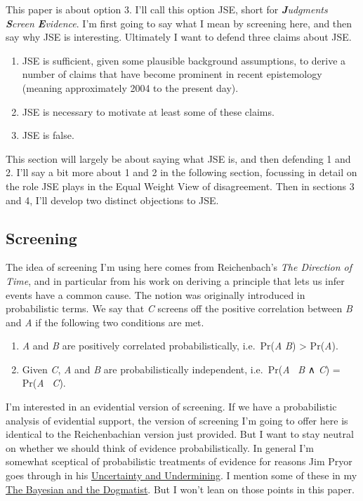 \documentclass[
  11pt,
  letterpaper,
  DIV=11,
  numbers=noendperiod,
  twoside]{scrartcl}
\providecommand{\tightlist}{%
  \setlength{\itemsep}{0pt}\setlength{\parskip}{0pt}}
\begin{document}
This paper is about option 3. I'll call this option JSE, short for
\emph{\textbf{J}udgments \textbf{S}creen \textbf{E}vidence}. I'm first
going to say what I mean by screening here, and then say why JSE is
interesting. Ultimately I want to defend three claims about JSE.

\begin{enumerate}
\def\labelenumi{\arabic{enumi}.}
\tightlist
\item
  JSE is sufficient, given some plausible background assumptions, to
  derive a number of claims that have become prominent in recent
  epistemology (meaning approximately 2004 to the present day).
\item
  JSE is necessary to motivate at least some of these claims.
\item
  JSE is false.
\end{enumerate}

This section will largely be about saying what JSE is, and then
defending 1 and 2. I'll say a bit more about 1 and 2 in the following
section, focussing in detail on the role JSE plays in the Equal Weight
View of disagreement. Then in sections 3 and 4, I'll develop two
distinct objections to JSE.

\subsection{Screening}\label{screening-1}

The idea of screening I'm using here comes from Reichenbach's \emph{The
Direction of Time}, and in particular from his work on deriving a
principle that lets us infer events have a common cause. The notion was
originally introduced in probabilistic terms. We say that \emph{C}
screens off the positive correlation between \emph{B} and \emph{A} if
the following two conditions are met.

\begin{enumerate}
\def\labelenumi{\arabic{enumi}.}
\tightlist
\item
  \emph{A} and \emph{B} are positively correlated probabilistically,
  i.e.~Pr(\emph{A} \textbar{} \emph{B}) \textgreater{} Pr(\emph{A}).
\item
  Given \emph{C}, \emph{A} and \emph{B} are probabilistically
  independent, i.e.~Pr(\emph{A}~\textbar{} \emph{B} ∧ \emph{C}) =
  Pr(\emph{A}~\textbar{} \emph{C}).
\end{enumerate}

I'm interested in an evidential version of screening. If we have a
probabilistic analysis of evidential support, the version of screening
I'm going to offer here is identical to the Reichenbachian version just
provided. But I want to stay neutral on whether we should think of
evidence probabilistically. In general I'm somewhat sceptical of
probabilistic treatments of evidence for reasons Jim Pryor goes through
in his
\href{http://www.jimpryor.net/research/papers/Uncertainty.pdf}{Uncertainty
and Undermining}. I mention some of these in my
\href{http://brian.weatherson.org/tbatd.pdf}{The Bayesian and the
Dogmatist}. But I won't lean on those points in this paper.
\end{document}
